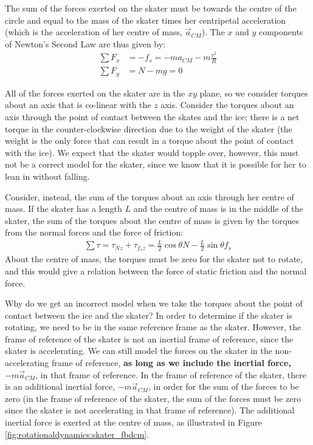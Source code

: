 The sum of the forces exerted on the skater must be towards the centre of the circle and equal to the mass of the skater times her centripetal acceleration (which is the acceleration of her centre of mass, $\vec a_{CM}$). The $x$ and $y$ components of Newton's Second Law are thus given by:
\begin{align*}
\sum F_x &= -f_s = -ma_{CM}- m\frac{v^2}{R}\\
\sum F_y &= N-mg = 0
\end{align*}

All of the forces exerted on the skater are in the $xy$ plane, so we consider torques about an axis that is co-linear with the $z$ axis. Consider the torques about an axis through the point of contact between the skates and the ice; there is a net torque in the counter-clockwise direction due to the weight of the skater (the weight is the only force that can result in a torque about the point of contact with the ice). We expect that the skater would topple over, however, this must not be a correct model for the skater, since we know that it is possible for her to lean in without falling. 

Consider, instead, the sum of the torques about an axis through her centre of mass. If the skater has a length $L$ and the centre of mass is in the middle of the skater, the sum of the torques about the centre of mass is given by the torques from the normal forces and the force of friction:
\begin{align*}
\sum \tau = \tau_{Nz} + \tau_{f_sz} = \frac{L}{2}\cos\theta N - \frac{L}{2}\sin\theta f_s
\end{align*}
About the centre of mass, the torques must be zero for the skater not to rotate, and this would give a relation between the force of static friction and the normal force.

Why do we get an incorrect model when we take the torques about the point of contact between the ice and the skater? In order to determine if the skater is rotating, we need to be in the same reference frame as the skater. However, the frame of reference of the skater is not an inertial frame of reference, since the skater is accelerating. We can still model the forces on the skater in the non-accelerating frame of reference, \textbf{as long as we include the inertial force, $-m\vec a_{CM}$}, in that frame of reference. In the frame of reference of the skater, there is an additional inertial force, $-m\vec a_{CM}$, in order for the sum of the forces to be zero (in the frame of reference of the skater, the sum of the forces must be zero since the skater is not accelerating in that frame of reference). The additional inertial force is exerted at the centre of mass, as illustrated in Figure \ref{fig:rotationaldynamics:skater_fbdcm}.

